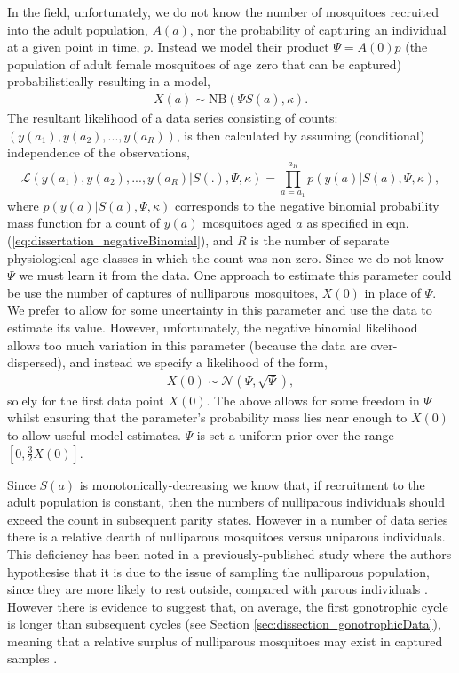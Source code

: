 \documentclass[12pt]{article}
\begin{document}
{In the field, unfortunately, we do not know the number of mosquitoes recruited into the adult population, $A(a)$, nor the probability of capturing an individual at a given point in time, $p$. Instead we model their product $\Psi=A(0)p$ (the population of adult female mosquitoes of age zero that can be captured) probabilistically resulting in a model,
%
\begin{align}\label{eq:dissertation_negativeBinomial}
X(a) \sim \text{NB}(\Psi S(a),\kappa).
\end{align}
%
The resultant likelihood of a data series consisting of counts: $(y(a_1),y(a_2),...,y(a_R))$, is then calculated by assuming (conditional) independence of the observations,
%
\begin{equation}
\mathcal{L}(y(a_1),y(a_2),...,y(a_R)|S(.),\Psi,\kappa) = \prod\limits_{a=a_1}^{a_R} p(y(a)|S(a),\Psi,\kappa),
\end{equation}
%
where $p(y(a)|S(a),\Psi,\kappa)$ corresponds to the negative binomial probability mass function for a count of $y(a)$ mosquitoes aged $a$ as specified in eqn. (\ref{eq:dissertation_negativeBinomial}), and $R$ is the number of separate physiological age classes in which the count was non-zero.
%
Since we do not know $\Psi$ we must learn it from the data. One approach to estimate this parameter could be use the number of captures of nulliparous mosquitoes, $X(0)$ in place of $\Psi$. We prefer to allow for some uncertainty in this parameter and use the data to estimate its value. However, unfortunately, the negative binomial likelihood allows too much variation in this parameter (because the data are over-dispersed), and instead we specify a likelihood of the form,
%
\begin{align}
X(0) \sim \mathcal{N}(\Psi,\sqrt{\Psi}),
\end{align}
%
solely for the first data point $X(0)$. The above allows for some freedom in $\Psi$ whilst ensuring that the parameter's probability mass lies near enough to $X(0)$ to allow useful model estimates. $\Psi$ is set a uniform prior over the range $[0,\frac{3}{2}X(0)]$.

Since $S(a)$ is monotonically-decreasing we know that, if recruitment to the adult population is constant, then the numbers of nulliparous individuals should exceed the count in subsequent parity states. However in a number of data series there is a relative dearth of nulliparous mosquitoes versus uniparous individuals. This deficiency has been noted in a previously-published study where the authors hypothesise that it is due to the issue of sampling the nulliparous population, since they are more likely to rest outside, compared with parous individuals \citep{gillies1965study}. However there is evidence to suggest that, on average, the first gonotrophic cycle is longer than subsequent cycles (see Section \ref{sec:dissection_gonotrophicData}), meaning that a relative surplus of nulliparous mosquitoes may exist in captured samples \citep{clements1981analysis}.

}
\end{document}
